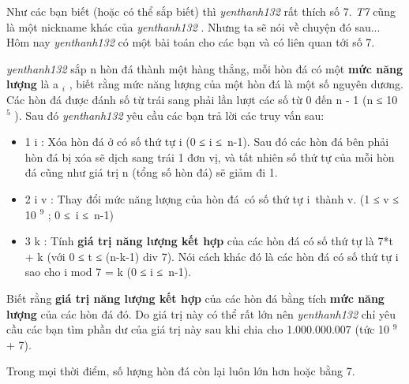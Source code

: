 Như các bạn biết (hoặc có thể sắp biết) thì   \emph{    yenthanh132   }   rất thích số 7.   \emph{    T7   }   cũng là một nickname khác của   \emph{    yenthanh132   }   . Nhưng ta sẽ nói về chuyện đó sau... Hôm nay   \emph{    yenthanh132   }   có một bài toán cho các bạn và có liên quan tới số 7.  

\emph{    yenthanh132   }   sắp n hòn đá thành một hàng thẳng, mỗi hòn đá có một   \textbf{    mức năng lượng   }   là a   $_    i   $   , biết rằng mức năng lượng của một hòn đá là một số nguyên dương. Các hòn đá được đánh số từ trái sang phải lần lượt các số từ 0 đến n - 1 (n ≤ 10   $^    5   $   ). Sau đó   \emph{    yenthanh132   }   yêu cầu các bạn trả lời các truy vấn sau:  
\begin{itemize}
	\item     1 i : Xóa hòn đá ở có số thứ tự i (0 ≤ i ≤ n-1). Sau đó các hòn đá bên phải hòn đá bị xóa sẽ dịch sang trái 1 đơn vị, và tất nhiên số thứ tự của mỗi hòn đá cũng như giá trị n (tổng số hòn đá) sẽ giảm đi 1.   
	\item     2 i v : Thay đổi mức năng lượng của hòn đá có số thứ tự i thành v. (1 ≤ v ≤ 10    $^     9    $    ; 0 ≤ i ≤ n-1)   
	\item     3 k : Tính    \textbf{     giá trị năng lượng kết hợp    }    của các hòn đá có số thứ tự là 7*t + k (với 0 ≤ t ≤ (n-k-1) div 7). Nói cách khác đó là các hòn đá có số thứ tự i sao cho i mod 7 = k (0 ≤ i ≤ n-1).   
\end{itemize}

   Biết rằng   \textbf{    giá trị năng lượng kết hợp   }   của các hòn đá bằng tích   \textbf{    mức năng lượng   }   của các hòn đá đó. Do giá trị này có thể rất lớn nên   \emph{    yenthanh132   }   chỉ yêu cầu các bạn tìm phần dư của giá trị này sau khi chia cho 1.000.000.007 (tức 10   $^    9   $   + 7).  

   Trong mọi thời điểm, số lượng hòn đá còn lại luôn lớn hơn hoặc bằng 7.